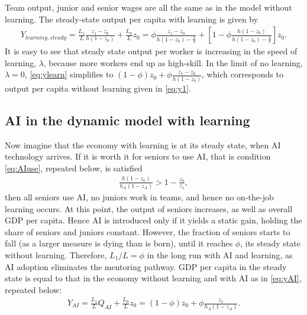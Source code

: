 \documentclass[12pt]{article}
\begin{document}
{Team output, junior and senior wages are all the same as in the model without learning. The steady-state output per capita with learning is given by  
\begin{align}\label{eq:ylearn}
Y_{learning, steady} = \frac{L_1}{L} \frac{z_1-z_0}{h(1-z_0)} + \frac{L_0}{L} z_0=%
\phi \frac{z_1 - z_0}{h(1-z_0) - \frac{\lambda}{\delta}}+\left[1-\phi\frac{h(1-z_0)}{h(1-z_0) - \frac{\lambda}{\delta}}\right]z_0.
\end{align}
It is easy to see that steady state output per worker is increasing in the speed of learning, $\lambda$, because more workers end up as high-skill. In the limit of no learning, $\lambda=0$, \eqref{eq:ylearn} simplifies to
$(1-\phi)z_0 + \phi\frac{z_1 - z_0}{h(1-z_0)}$, which corresponds to output per capita without learning given in \eqref{eq:y1}.

\subsection{AI in the dynamic model with learning}

Now imagine that the economy with learning is at its steady state, when AI technology arrives. If it is worth it for seniors to use AI, that is condition \eqref{eq:AIuse}, repeated below, is satisfied 
\begin{align*}
\frac{h(1-z_0)}{h_A(1-z_A)} > 1- \frac{z_0}{z_1},
\end{align*}
then all seniors use AI, no juniors work in teams, and hence no on-the-job learning occurs. At this point, the output of seniors increases, as well as overall GDP per capita. Hence AI is introduced only if it yields a static gain, holding the share of seniors and juniors constant. However, the fraction of seniors starts to fall (as a larger measure is dying than is born), until it reaches $\phi$, its steady state without learning. Therefore, \(L_1/L = \phi\) in the long run with AI and learning, as AI adoption eliminates the mentoring pathway. GDP per capita in the steady state is equal to that in the economy without learning and with AI as in \eqref{eq:yAI}, repeated below:
\begin{align*}
Y_{AI} = \frac{L_1}{L}Q_{AI}+\frac{L_0}{L}z_0=(1-\phi)z_0+\phi\frac{z_1}{h_A(1-z_A)}.
\end{align*}

}
\end{document}
